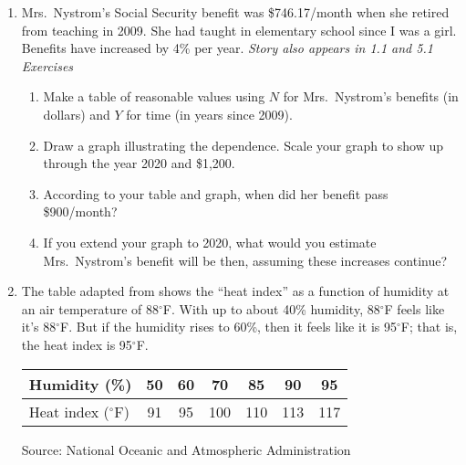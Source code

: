 \begin{enumerate}
\item Mrs.\ Nystrom's Social Security benefit was \$746.17/month when she retired from teaching in 2009. She had taught in elementary school since I was a girl.   Benefits have increased by 4\% per year.  \hfill \emph{Story also appears in 1.1 and 5.1 Exercises}
\begin{enumerate}
\item Make a table of reasonable values using $N$ for Mrs.\ Nystrom's benefits (in dollars) and $Y$ for time (in years since 2009).  
\item Draw a graph illustrating the dependence.  Scale your graph to show up through the year 2020 and \$1,200.
\item According to your table and graph, when did her benefit pass \$900/month?
\item If you extend your graph to 2020, what would you estimate Mrs.\ Nystrom's benefit will be then, assuming these increases continue?
\end{enumerate}  

\item The table adapted from shows the ``heat index'' as a function of humidity at an air temperature of 88$^\circ$F. With up to about 40\% humidity, 88$^\circ$F feels like it's 88$^\circ$F. But if the humidity rises to 60\%, then it feels like it is 95$^\circ$F;  that is, the heat index is 95$^\circ$F.  
\begin{center}
\begin{tabular} {|l| |c|c|c|c|c|c|} \hline
Humidity (\%)  & 50 & 60 & 70 & 85 & 90 & 95 \\ \hline
Heat index ($^\circ$F)  & 91 & 95 & 100 & 110 & 113 & 117 \\ \hline
\end{tabular}
\end{center}
\hfill \begin{footnotesize} Source:  National Oceanic and Atmospheric Administration  \end{footnotesize}


\end{enumerate}
